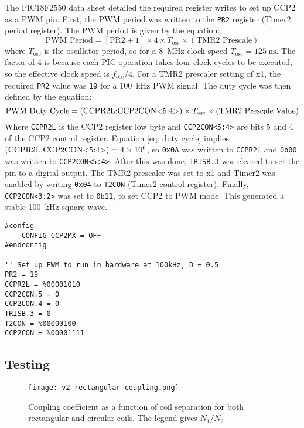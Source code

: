 The PIC18F2550 data sheet \cite{pic18f2550} detailed the required register writes to set up CCP2 as a PWM pin. First, the PWM period was written to the \verb|PR2| register (Timer2 period register). The PWM period is given by the equation:
\begin{equation}
\text{PWM Period} = [\text{PR2}+1] \times 4 \times T_\text{osc} \times (\text{TMR2 Prescale})
\end{equation}
where $T_\text{osc}$ is the oscillator period, so for a \SI{8}{\mega\hertz} clock speed $T_\text{osc}=\SI{125}{\nano\second}$. The factor of 4 is because each PIC operation takes four clock cycles to be executed, so the effective clock speed is $f_\text{osc}/4$. For a TMR2 prescaler setting of x1, the required \verb|PR2| value was \verb|19| for a \SI{100}{\kilo\hertz} PWM signal. The duty cycle was then defined by the equation:
\begin{equation}
\text{PWM Duty Cycle} = (\text{CCPR2L:CCP2CON\textless5:4\textgreater}) \times T_\text{osc} \times (\text{TMR2 Prescale Value}) \label{eq: duty cycle}
\end{equation}
Where \verb|CCPR2L| is the CCP2 register low byte and \verb|CCP2CON<5:4>| are bits 5 and 4 of the CCP2 control register. Equation \ref{eq: duty cycle} implies $(\text{CCPR2L:CCP2CON\textless5:4\textgreater}) = \num{4e6}$, so \verb|0x0A| was written to \verb|CCPR2L| and \verb|0b00| was written to \verb|CCP2CON<5:4>|. After this was done, \verb|TRISB.3| was cleared to set the pin to a digital output. The TMR2 prescaler was set to x1 and Timer2 was enabled by writing \verb|0x04| to \verb|T2CON| (Timer2 control register). Finally, \verb|CCP2CON<3:2>| was set to \verb|0b11|, to set CCP2 to PWM mode. This generated a stable \SI{100}{\kilo\hertz} square wave.

\begin{lstlisting}
#config
    CONFIG CCP2MX = OFF
#endconfig

'' Set up PWM to run in hardware at 100kHz, D = 0.5
PR2 = 19
CCPR2L = %00001010
CCP2CON.5 = 0
CCP2CON.4 = 0
TRISB.3 = 0
T2CON = %00000100
CCP2CON = %00001111
\end{lstlisting}




\subsection{Testing}
\begin{figure}[htb]
	\centering
	\texttt{[image: v2 rectangular coupling.png]}
	\caption{Coupling coefficient as a function of coil separation for both rectangular and circular coils. The legend gives $N_1/N_2$}
	\label{fig: rectangular coupling}
\end{figure}


